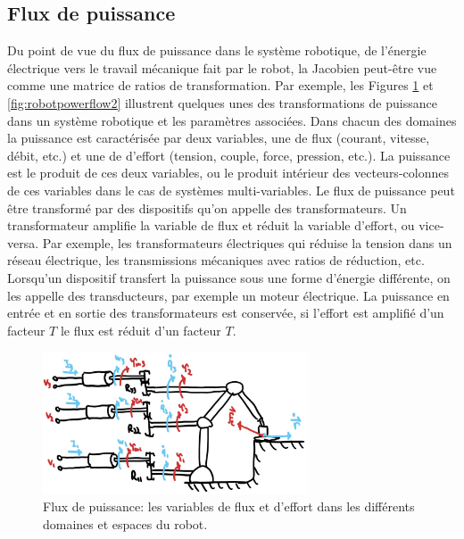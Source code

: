 \subsection{Flux de puissance}

Du point de vue du flux de puissance dans le système robotique, de l'énergie électrique vers le travail mécanique fait par le robot, la Jacobien peut-être vue comme une matrice de ratios de transformation. Par exemple, les Figures \ref{fig:robotpowerflow1} et \ref{fig:robotpowerflow2} illustrent quelques unes des transformations de puissance dans un système robotique et les paramètres associées. Dans chacun des domaines la puissance est caractérisée par deux variables, une de flux (courant, vitesse, débit, etc.) et une de d'effort (tension, couple, force, pression, etc.). La puissance est le produit de ces deux variables, ou le produit intérieur des vecteurs-colonnes de ces variables dans le cas de systèmes multi-variables. Le flux de puissance peut être transformé par des dispositifs qu'on appelle des transformateurs. Un transformateur amplifie la variable de flux et réduit la variable d'effort, ou vice-versa. Par exemple, les transformateurs électriques qui réduise la tension dans un réseau électrique, les transmissions mécaniques avec ratios de réduction, etc. Lorsqu'un dispositif transfert la puissance sous une forme d'énergie différente, on les appelle des transducteurs, par exemple un moteur électrique. La puissance en entrée et en sortie des transformateurs est conservée, si l'effort est amplifié d'un facteur $T$ le flux est réduit d'un facteur $T$. 

\begin{figure}[htpb]
	\centering
		\includegraphics[width=0.70\textwidth]{fig/robotpowerflow1.jpg}
	\caption{Flux de puissance: les variables de flux et d'effort dans les différents domaines et espaces du robot.}
	\label{fig:robotpowerflow1}
\end{figure}


